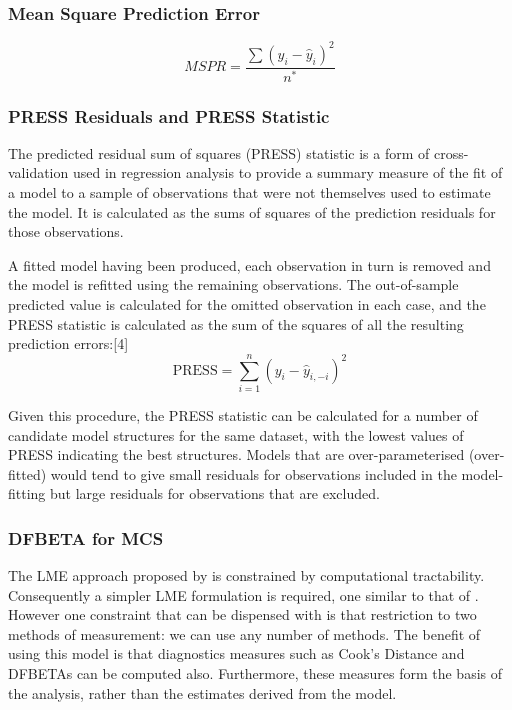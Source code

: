 \documentclass[12pt, a4paper]{report}
\theoremstyle{plain}
\theoremstyle{definition}
\theoremstyle{remark}
\begin{document}
	
	
	
	
	
	

	\subsubsection{Mean Square Prediction Error}
	\begin{equation}
	MSPR = \frac{\sum (y_{i}-\hat{y}_{i})^2}{n^*}
	\end{equation}
	
\subsubsection{PRESS Residuals and PRESS Statistic}
	The predicted residual sum of squares (PRESS) statistic is a form of cross-validation used in regression analysis to provide a summary measure of the fit of a model to a sample of observations that were not themselves used to estimate the model. It is calculated as the sums of squares of the prediction residuals for those observations.
	
	A fitted model having been produced, each observation in turn is removed and the model is refitted using the remaining observations. The out-of-sample predicted value is calculated for the omitted observation in each case, and the PRESS statistic is calculated as the sum of the squares of all the resulting prediction errors:[4]
	\[\mbox{PRESS} =\sum_{i=1}^n (y_i - \hat{y}_{i, -i})^2 \]

	Given this procedure, the PRESS statistic can be calculated for a number of candidate model structures for the same dataset, with the lowest values of PRESS indicating the best structures. Models that are over-parameterised (over-fitted) would tend to give small residuals for observations included in the model-fitting but large residuals for observations that are excluded.
	




	\subsubsection{DFBETA for MCS}
	The LME approach proposed by \citet{ARoy2009} is constrained by computational tractability.
	Consequently a simpler LME formulation is required, one similar to that of \citet{BXC2008}. However one constraint that can be dispensed with is that restriction to
	two methods of measurement: we can use any number of methods.
	The benefit of using this model is that diagnostics measures such as Cook's Distance and DFBETAs can be computed also. Furthermore, these measures
	form the basis of the analysis, rather than the estimates derived from the model.
	
\end{document}
